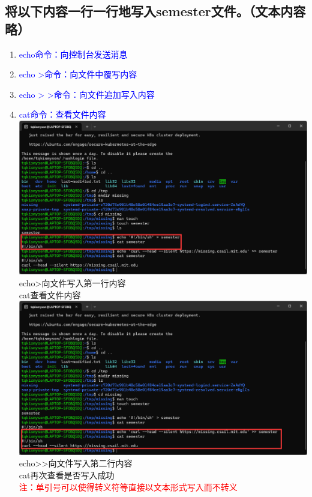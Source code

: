 \documentclass[12pt,a4paper,UTF8]{article}
\begin{document}
    \subsection{将以下内容一行一行地写入semester文件。（文本内容略）}
    \begin{enumerate}
        \item \textcolor{blue}{echo命令：向控制台发送消息}\\
        \item \textcolor{blue}{echo >命令：向文件中覆写内容}\\
        \item \textcolor{blue}{echo > >命令：向文件追加写入内容}\\
        \item \textcolor{blue}{cat命令：查看文件内容}\\[8pt]
        \includegraphics[scale=0.25]{pictures/Shell/3_1.png} 
        echo>向文件写入第一行内容\\
        cat查看文件内容\\[8pt]
        \includegraphics[scale=0.25]{pictures/Shell/3_2.png}
        echo>>向文件写入第二行内容\\
        cat再次查看是否写入成功\\
        \textcolor{red}{注：单引号可以使得转义符等直接以文本形式写入而不转义}
    \end{enumerate}
\end{document}
